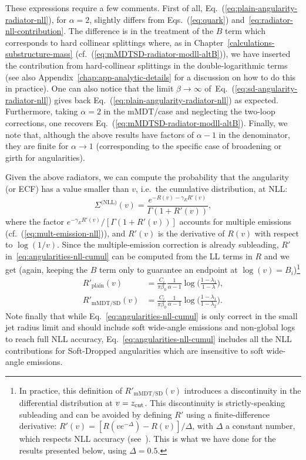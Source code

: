 These expressions require a few comments. First of all,
Eq.~(\ref{eq:plain-angularity-radiator-nll}), for $\alpha=2$, slightly
differs from Eqs.~(\ref{eq:quark})
and~\eqref{eq:radiator-nll-contribution}.
%
The difference is in the treatment of the $B$ term which corresponds
to hard collinear splittings where, as in
Chapter~\ref{calculations-substructure-mass}
(cf.~(\ref{eq:mMDTSD-radiator-modll-altB})), we have inserted the
contribution from hard-collinear splittings in the double-logarithmic
terms (see also Appendix~\ref{chap:app-analytic-details} for a
discussion on how to do this in practice).
%
One can also notice that the limit $\beta\to\infty$
of~Eq.~(\ref{eq:sd-angularity-radiator-nll}) gives back
Eq.~(\ref{eq:plain-angularity-radiator-nll}) as expected.
%
Furthermore, taking $\alpha=2$ in the mMDT/\SD case and neglecting the
two-loop corrections, one recovers
Eq.~(\ref{eq:mMDTSD-radiator-modll-altB}).
%
Finally, we note that, although the above results have factors of $\alpha-1$ in the
denominator, they are finite for $\alpha\to 1$ (corresponding to the
specific case of broadening or girth for angularities). 

Given the above radiators, we can compute the probability that the
angularity (or ECF) has a value smaller than $v$, i.e.\ the cumulative distribution, at NLL:
\begin{equation}\label{eq:angularities-nll-cumul}
  \Sigma^\text{(NLL)}(v) = \frac{e^{-R(v)-\gamma_E R'(v)}}{\Gamma(1+R'(v))},
\end{equation}
where the factor $e^{-\gamma_E R'(v)}/[\Gamma(1+R'(v))]$ accounts for
multiple emissions (cf.~(\ref{eq:mult-emission-nll})), and $R'(v)$ is
the derivative of $R(v)$ with respect to $\log(1/v)$. Since the multiple-emission
correction is already subleading, $R'$
in~\eqref{eq:angularities-nll-cumul} can be computed from the LL terms
in $R$ and we get (again, keeping the $B$ term only to guarantee an
endpoint at $\log(v)=B_i$)\footnote{In practice, this definition of
  $R'_\text{mMDT/SD}(v)$ introduces a discontinuity in the
  differential distribution at $v=z_{\text{cut}}$. This discontinuity is
  strictly-speaking subleading and can be avoided by defining $R'$
  using a finite-difference derivative:
  $R'(v)=[R(v e^{-\Delta})-R(v)]/\Delta$, with $\Delta$ a constant
  number, which respects NLL accuracy
  (see~\cite{Larkoski:2014wba}). This is what we have done for the
  results presented below, using $\Delta=0.5$.}
\begin{align}\label{eq:angularities-Rp}
R'_\text{plain}(v) & = \frac{C_i}{\pi\beta_0}\frac{1}{\alpha-1}\log\bigg(\frac{1-\lambda_1}{1-\lambda}\bigg),\\
R'_\text{mMDT/SD}(v) & = \frac{C_i}{\pi\beta_0}\frac{1}{\alpha-1}\log\bigg(\frac{1-\lambda_1}{1-\lambda_2}\bigg).
\end{align}
Note finally that while Eq.~\eqref{eq:angularities-nll-cumul} is only
correct in the small jet radius limit and should include soft
wide-angle emissions and non-global logs to reach full NLL accuracy,
Eq.~\eqref{eq:angularities-nll-cumul} includes all the NLL
contributions for Soft-Dropped angularities which are insensitive to soft
wide-angle emissions.

